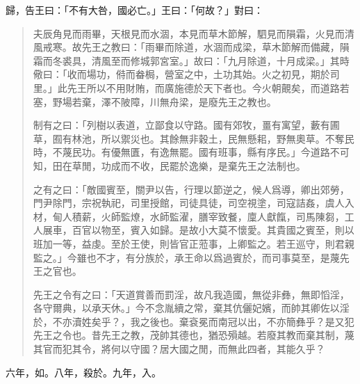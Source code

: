 歸，告王曰：「不有大咎，國必亡。」王曰：「何故？」對曰：

\begin{quotation}
夫辰角見而雨畢，天根見而水涸，本見而草木節解，駟見而隕霜，火見而清風戒寒。故先王之教曰：「雨畢而除道，水涸而成梁，草木節解而備藏，隕霜而冬裘具，清風至而修城郭宮室。」故曰：「九月除道，十月成梁。」其時儆曰：「收而場功，偫而畚梮，營室之中，土功其始。火之初見，期於司里。」此先王所以不用財賄，而廣施德於天下者也。今火朝覿矣，而道路若塞，野場若棄，澤不陂障，川無舟梁，是廢先王之教也。

制有之曰：「列樹以表道，立鄙食以守路。國有郊牧，畺有寓望，藪有圃草，囿有林池，所以禦災也。其餘無非穀土，民無懸耜，野無奧草。不奪民時，不蔑民功。有優無匱，有逸無罷。國有班事，縣有序民。」今道路不可知，田在草閒，功成而不收，民罷於逸樂，是棄先王之法制也。

之有之曰：「敵國賓至，關尹以告，行理以節逆之，候人爲導，卿出郊勞，門尹除門，宗祝執祀，司里授館，司徒具徒，司空視塗，司寇詰姦，虞人入材，甸人積薪，火師監燎，水師監濯，膳宰致餐，廩人獻餼，司馬陳芻，工人展車，百官以物至，賓入如歸。是故小大莫不懷愛。其貴國之賓至，則以班加一等，益虔。至於王使，則皆官正蒞事，上卿監之。若王巡守，則君親監之。」今雖也不才，有分族於，承王命以爲過賓於，而司事莫至，是蔑先王之官也。

先王之令有之曰：「天道賞善而罰淫，故凡我造國，無從非彝，無即慆淫，各守爾典，以承天休。」今不念胤續之常，棄其伉儷妃嬪，而帥其卿佐以淫於，不亦瀆姓矣乎？，我之後也。棄袞冕而南冠以出，不亦簡彝乎？是又犯先王之令也。昔先王之教，茂帥其德也，猶恐殞越。若廢其教而棄其制，蔑其官而犯其令，將何以守國？居大國之閒，而無此四者，其能久乎？
\end{quotation}

六年，如。八年，殺於。九年，入。

\theendnotes

